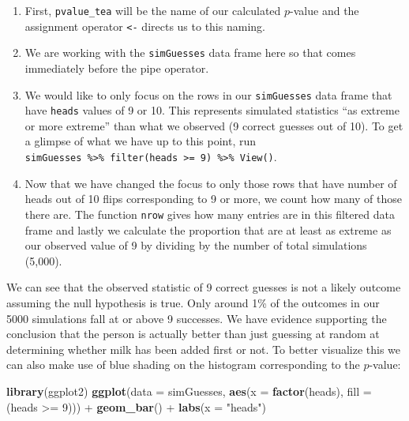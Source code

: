 \documentclass[]{tufte-book}
\newenvironment{Shaded}{\begin{snugshade}}{\end{snugshade}}
\newcommand{\KeywordTok}[1]{\textcolor[rgb]{0.13,0.29,0.53}{\textbf{{#1}}}}
\newcommand{\DataTypeTok}[1]{\textcolor[rgb]{0.13,0.29,0.53}{{#1}}}
\newcommand{\DecValTok}[1]{\textcolor[rgb]{0.00,0.00,0.81}{{#1}}}
\newcommand{\StringTok}[1]{\textcolor[rgb]{0.31,0.60,0.02}{{#1}}}
\newcommand{\NormalTok}[1]{{#1}}
\begin{document}
\begin{enumerate}
\def\labelenumi{\arabic{enumi}.}
\item
  First, \texttt{pvalue\_tea} will be the name of our calculated
  \(p\)-value and the assignment operator \texttt{\textless{}-} directs
  us to this naming.
\item
  We are working with the \texttt{simGuesses} data frame here so that
  comes immediately before the pipe operator.\\
\item
  We would like to only focus on the rows in our \texttt{simGuesses}
  data frame that have \texttt{heads} values of 9 or 10. This represents
  simulated statistics ``as extreme or more extreme'' than what we
  observed (9 correct guesses out of 10). To get a glimpse of what we
  have up to this point, run
  \texttt{simGuesses\ \%\textgreater{}\%\ filter(heads\ \textgreater{}=\ 9)\ \%\textgreater{}\%\ View()}.
\item
  Now that we have changed the focus to only those rows that have number
  of heads out of 10 flips corresponding to 9 or more, we count how many
  of those there are. The function \texttt{nrow} gives how many entries
  are in this filtered data frame and lastly we calculate the proportion
  that are at least as extreme as our observed value of 9 by dividing by
  the number of total simulations (5,000).
\end{enumerate}

We can see that the observed statistic of 9 correct guesses is not a
likely outcome assuming the null hypothesis is true. Only around 1\% of
the outcomes in our 5000 simulations fall at or above 9 successes. We
have evidence supporting the conclusion that the person is actually
better than just guessing at random at determining whether milk has been
added first or not. To better visualize this we can also make use of
blue shading on the histogram corresponding to the \(p\)-value:

\begin{Shaded}
\begin{Highlighting}[]
\KeywordTok{library}\NormalTok{(ggplot2)}
  \KeywordTok{ggplot}\NormalTok{(}\DataTypeTok{data =} \NormalTok{simGuesses, }\KeywordTok{aes}\NormalTok{(}\DataTypeTok{x =} \KeywordTok{factor}\NormalTok{(heads), }\DataTypeTok{fill =} \NormalTok{(heads >=}\StringTok{ }\DecValTok{9}\NormalTok{))) +}
\StringTok{  }\KeywordTok{geom_bar}\NormalTok{() +}
\StringTok{  }\KeywordTok{labs}\NormalTok{(}\DataTypeTok{x =} \StringTok{"heads"}\NormalTok{)}
\end{Highlighting}
\end{Shaded}
\end{document}
